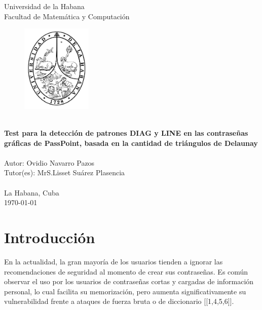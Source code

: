 \documentclass[12pt]{report}
\begin{document}
\begin{titlepage}
    \centering
    {\Huge {Universidad de la Habana}}\\[1cm]
    {\Huge {Facultad de Matemática y Computación }}\\[0.5cm]
 
    \begin{figure}[h]
    	\centering
    	\includegraphics[width=0.3\textwidth]{logoUH.png}
    \end{figure}
    {\noindent\hrulefill}\\[0.2cm]
    
    {\Large\textbf{{Test para la detección de patrones DIAG y LINE  en las contraseñas gráficas de PassPoint, basada en la cantidad de triángulos de Delaunay }}}\\[0.1cm]
    {\noindent\hrulefill}\\[1.0cm]
    
    
 
    
    {\Large {Autor: Ovidio Navarro Pazos}}\\[2cm]
   	{\Large {Tutor(es): MrS.Lisset Suárez Plasencia}}\\
   	\\[2.0cm]
   	
   	{\large{La Habana, Cuba}}\\
    {\large  \today}
\end{titlepage}

\tableofcontents
\newpage
\listoffigures
\newpage
\listoftables

\chapter*{Introducción}
\hypertarget{introduccion}{}


	En la actualidad, la gran mayoría de los usuarios tienden a ignorar las recomendaciones de seguridad al momento de crear sus contraseñas. Es común observar el uso por los usuarios de contraseñas cortas y cargadas de información personal, lo cual facilita su memorización, pero aumenta significativamente su vulnerabilidad frente a ataques de fuerza bruta o de diccionario [[1,4,5,6]].
	
\end{document}

